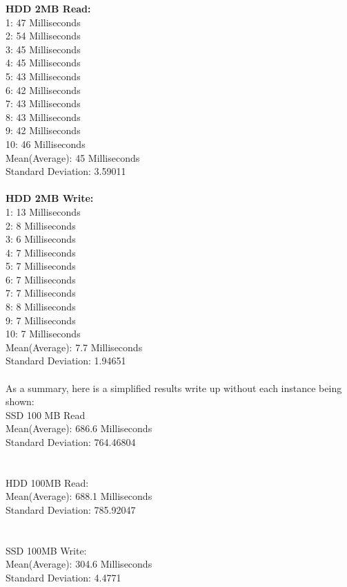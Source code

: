 \documentclass{article}
\begin{document}
\textbf{HDD 2MB Read:}
\\
1: 47 Milliseconds
\\
2: 54 Milliseconds
\\
3: 45 Milliseconds
\\
4: 45 Milliseconds
\\
5: 43 Milliseconds
\\
6: 42 Milliseconds
\\
7: 43 Milliseconds
\\
8: 43 Milliseconds
\\
9: 42 Milliseconds
\\
10: 46 Milliseconds
\\
Mean(Average): 45 Milliseconds
\\
Standard Deviation: 3.59011 
\\
\\
\textbf{HDD 2MB Write:}
\\
1: 13 Milliseconds
\\
2: 8 Milliseconds
\\
3: 6 Milliseconds
\\
4: 7 Milliseconds
\\
5: 7 Milliseconds
\\
6: 7 Milliseconds
\\
7: 7 Milliseconds
\\
8: 8 Milliseconds
\\
9: 7 Milliseconds
\\
10: 7 Milliseconds
\\
Mean(Average): 7.7 Milliseconds
\\
Standard Deviation: 1.94651
\\
\\
As a summary, here is a simplified results write up without each instance being shown:
\\
SSD 100 MB Read\\
Mean(Average): 686.6 Milliseconds\\
Standard Deviation: 764.46804\\
\\
\\
HDD 100MB Read:\\
Mean(Average): 688.1 Milliseconds\\
Standard Deviation: 785.92047\\
\\
\\
SSD 100MB Write:\\
Mean(Average): 304.6 Milliseconds\\
Standard Deviation: 4.4771\\
\end{document}

